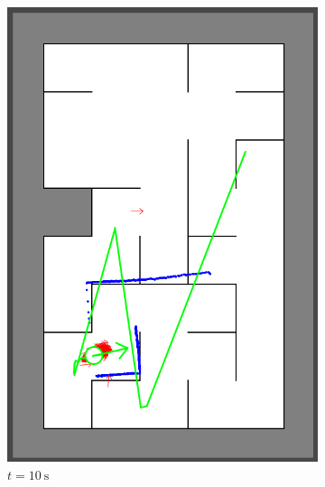 \begin{figure}[H]
     \hspace{1em}
     \begin{subfigure}{0.2\textwidth}
         \centering
         \includegraphics[width=\textwidth]{figures/localization_10s.png}
         \caption{$t = \SI{10}{\second}$}
         \label{mapping8s}
     \end{subfigure}
     \hspace{1em}
     \begin{subfigure}{0.2\textwidth}
         \centering

\end{subfigure}
\end{figure}
